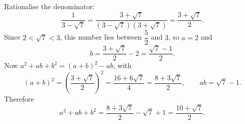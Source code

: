 Rationalise the denominator:
\[
\dfrac{1}{3-\sqrt7}=\dfrac{3+\sqrt7}{(3-\sqrt7)(3+\sqrt7)}=\dfrac{3+\sqrt7}{2}.
\]
Since $2<\sqrt7<3$, this number lies between $\dfrac{5}{2}$ and $3$, so $a=2$ and
\[
b=\dfrac{3+\sqrt7}{2}-2=\dfrac{\sqrt7-1}{2}.
\]
Now $a^2+ab+b^2=(a+b)^2-ab$, with
\[
(a+b)^2=\left(\dfrac{3+\sqrt7}{2}\right)^2=\dfrac{16+6\sqrt7}{4}=\dfrac{8+3\sqrt7}{2},\qquad ab=\sqrt7-1 .
\]
Therefore
\[
a^2+ab+b^2=\dfrac{8+3\sqrt7}{2}-\sqrt7+1=\boxed{\dfrac{10+\sqrt7}{2}}.
\]
